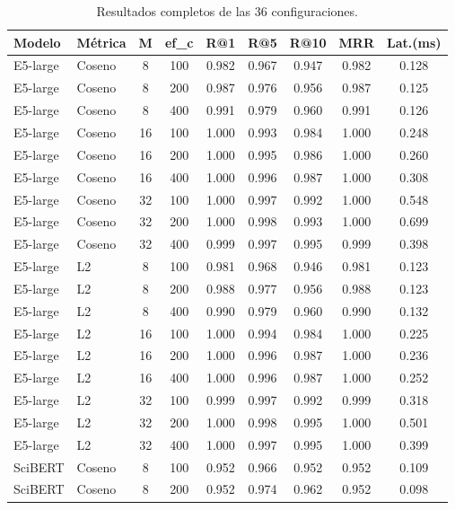 \begin{table}[H]
\caption{Resultados completos de las 36 configuraciones.}\label{tab:completa}
\centering
\footnotesize
\setlength{\tabcolsep}{4pt}
\renewcommand{\arraystretch}{0.9}
\begin{tabular}{|l|l|c|c|c|c|c|c|c|}
\hline
\textbf{Modelo} & \textbf{Métrica} & \textbf{M} & \textbf{ef\_c} & \textbf{R@1} & \textbf{R@5} & \textbf{R@10} & \textbf{MRR} & \textbf{Lat.(ms)} \\
\hline
E5-large & Coseno & 8 & 100 & 0.982 & 0.967 & 0.947 & 0.982 & 0.128 \\
E5-large & Coseno & 8 & 200 & 0.987 & 0.976 & 0.956 & 0.987 & 0.125 \\
E5-large & Coseno & 8 & 400 & 0.991 & 0.979 & 0.960 & 0.991 & 0.126 \\
E5-large & Coseno & 16 & 100 & 1.000 & 0.993 & 0.984 & 1.000 & 0.248 \\
E5-large & Coseno & 16 & 200 & 1.000 & 0.995 & 0.986 & 1.000 & 0.260 \\
E5-large & Coseno & 16 & 400 & 1.000 & 0.996 & 0.987 & 1.000 & 0.308 \\
E5-large & Coseno & 32 & 100 & 1.000 & 0.997 & 0.992 & 1.000 & 0.548 \\
E5-large & Coseno & 32 & 200 & 1.000 & 0.998 & 0.993 & 1.000 & 0.699 \\
E5-large & Coseno & 32 & 400 & 0.999 & 0.997 & 0.995 & 0.999 & 0.398 \\
E5-large & L2 & 8 & 100 & 0.981 & 0.968 & 0.946 & 0.981 & 0.123 \\
E5-large & L2 & 8 & 200 & 0.988 & 0.977 & 0.956 & 0.988 & 0.123 \\
E5-large & L2 & 8 & 400 & 0.990 & 0.979 & 0.960 & 0.990 & 0.132 \\
E5-large & L2 & 16 & 100 & 1.000 & 0.994 & 0.984 & 1.000 & 0.225 \\
E5-large & L2 & 16 & 200 & 1.000 & 0.996 & 0.987 & 1.000 & 0.236 \\
E5-large & L2 & 16 & 400 & 1.000 & 0.996 & 0.987 & 1.000 & 0.252 \\
E5-large & L2 & 32 & 100 & 0.999 & 0.997 & 0.992 & 0.999 & 0.318 \\
E5-large & L2 & 32 & 200 & 1.000 & 0.998 & 0.995 & 1.000 & 0.501 \\
E5-large & L2 & 32 & 400 & 1.000 & 0.997 & 0.995 & 1.000 & 0.399 \\
SciBERT & Coseno & 8 & 100 & 0.952 & 0.966 & 0.952 & 0.952 & 0.109 \\
SciBERT & Coseno & 8 & 200 & 0.952 & 0.974 & 0.962 & 0.952 & 0.098 \\

\end{tabular}
\end{table}
